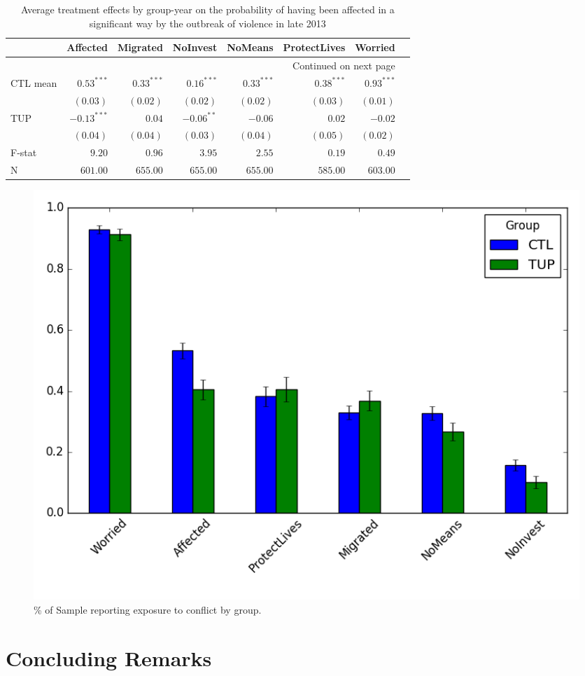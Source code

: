 \documentclass[12pt,article]{article}
\begin{document}
\begin{longtable}{lrrrrrrr}
\caption{\label{tab:conflict_exposure}Average treatment effects by group-year on the probability of having been affected in a significant way by the outbreak of violence in late 2013}
\\
\hline
 & Affected & Migrated & NoInvest & NoMeans & ProtectLives & Worried\\
\hline
\endhead
\hline\multicolumn{7}{r}{Continued on next page} \\
\endfoot
\endlastfoot
CTL mean & $0.53^{***}$ & $0.33^{***}$ & $0.16^{***}$ & $0.33^{***}$ & $0.38^{***}$ & $0.93^{***}$\\
 & $( 0.03)$ & $( 0.02)$ & $( 0.02)$ & $( 0.02)$ & $( 0.03)$ & $( 0.01)$\\
TUP & $-0.13^{***}$ & $0.04$ & $-0.06^{**}$ & $-0.06$ & $0.02$ & $-0.02$\\
 & $( 0.04)$ & $( 0.04)$ & $( 0.03)$ & $( 0.04)$ & $( 0.05)$ & $( 0.02)$\\
\hline
F-stat & $9.20$ & $0.96$ & $3.95$ & $2.55$ & $0.19$ & $0.49$\\
N & $601.00$ & $655.00$ & $655.00$ & $655.00$ & $585.00$ & $603.00$\\
\hline
\end{longtable}

\begin{figure}[htb]
\centering
\includegraphics[width=.9\linewidth]{../figures/conflict_exposure.png}
\caption{\label{fig:conflict_exposure}\% of Sample reporting exposure to conflict by group.}
\end{figure} 

\section*{Concluding Remarks}
\label{sec-4}
\end{document}
